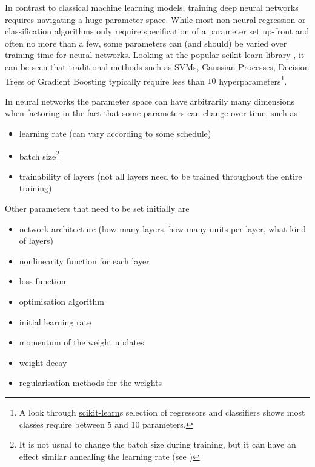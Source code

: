 In contrast to classical machine learning models, training deep neural networks
requires navigating a huge parameter space. While most non-neural regression or
classification algorithms only require specification of a parameter set up-front
and often no more than a few, some parameters can (and should) be varied over
training time for neural networks. Looking at the popular scikit-learn library \citep{scikit-learn},
it can be seen that traditional methods such as SVMs, Gaussian Processes,
Decision Trees or Gradient Boosting typically require less than $10$
hyperparameters\footnote{A look through
\href{http://scikit-learn.org/stable/supervised_learning.html\#supervised-learning}{scikit-learn}s
selection of regressors and classifiers shows most classes require between 5 and
10 parameters.}.

In neural networks the parameter space can have arbitrarily many dimensions when
factoring in the fact that some parameters can change over time, such as

\begin{itemize}
    \item
        learning rate (can vary according to some schedule)
    \item
        batch size\footnote{It is not usual to change the batch size during
            training, but it can have an effect similar annealing the learning
        rate (see \cite{DBLP:journals/corr/abs-1711-00489})}
    \item
        trainability of layers (not all layers need to be trained throughout the
        entire training)
\end{itemize}

Other parameters that need to be set initially are

\begin{itemize}
    \item
        network architecture (how many layers, how many units per layer,
        what kind of layers)
    \item
        nonlinearity function for each layer
    \item
        loss function
    \item
        optimisation algorithm
    \item
        initial learning rate
    \item
        momentum of the weight updates
    \item
        weight decay
    \item
        regularisation methods for the weights
\end{itemize}

